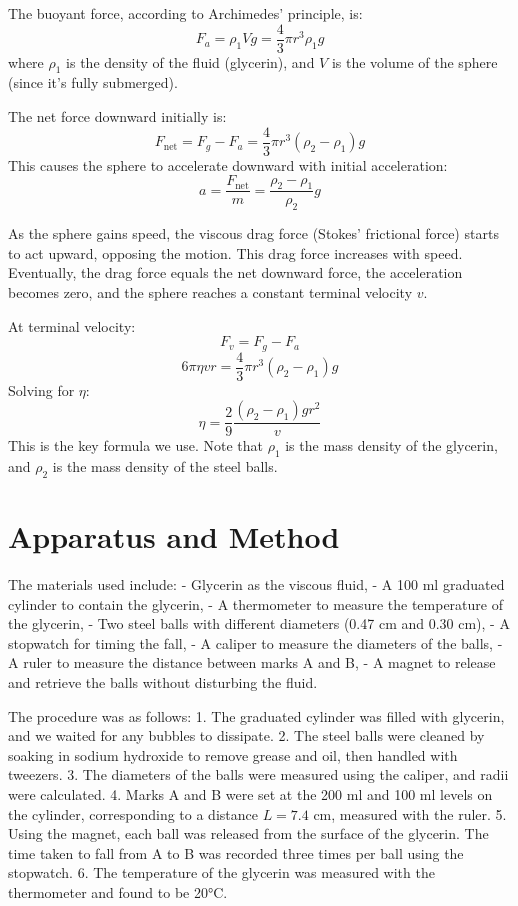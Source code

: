\documentclass[12pt, a4paper]{article}
\begin{document}
The buoyant force, according to Archimedes' principle, is:
\[ F_a = \rho_1 V g = \frac{4}{3} \pi r^3 \rho_1 g \]
where $\rho_1$ is the density of the fluid (glycerin), and $V$ is the volume of the sphere (since it's fully submerged).

The net force downward initially is:
\[ F_{\text{net}} = F_g - F_a = \frac{4}{3} \pi r^3 (\rho_2 - \rho_1) g \]
This causes the sphere to accelerate downward with initial acceleration:
\[ a = \frac{F_{\text{net}}}{m} = \frac{\rho_2 - \rho_1}{\rho_2} g \]

As the sphere gains speed, the viscous drag force (Stokes' frictional force) starts to act upward, opposing the motion. This drag force increases with speed. Eventually, the drag force equals the net downward force, the acceleration becomes zero, and the sphere reaches a constant terminal velocity $v$.

At terminal velocity:
\[ F_v = F_g - F_a \]
\[ 6\pi \eta v r = \frac{4}{3} \pi r^3 (\rho_2 - \rho_1) g \]
Solving for $\eta$:
\[ \eta = \frac{2}{9} \frac{(\rho_2 - \rho_1) g r^2}{v} \]
This is the key formula we use. Note that $\rho_1$ is the mass density of the glycerin, and $\rho_2$ is the mass density of the steel balls.

\section{Apparatus and Method}
The materials used include:
- Glycerin as the viscous fluid,
- A 100 ml graduated cylinder to contain the glycerin,
- A thermometer to measure the temperature of the glycerin,
- Two steel balls with different diameters (0.47 cm and 0.30 cm),
- A stopwatch for timing the fall,
- A caliper to measure the diameters of the balls,
- A ruler to measure the distance between marks A and B,
- A magnet to release and retrieve the balls without disturbing the fluid.

The procedure was as follows:
1. The graduated cylinder was filled with glycerin, and we waited for any bubbles to dissipate.
2. The steel balls were cleaned by soaking in sodium hydroxide to remove grease and oil, then handled with tweezers.
3. The diameters of the balls were measured using the caliper, and radii were calculated.
4. Marks A and B were set at the 200 ml and 100 ml levels on the cylinder, corresponding to a distance $L = 7.4$ cm, measured with the ruler.
5. Using the magnet, each ball was released from the surface of the glycerin. The time taken to fall from A to B was recorded three times per ball using the stopwatch.
6. The temperature of the glycerin was measured with the thermometer and found to be 20°C.
\end{document}
